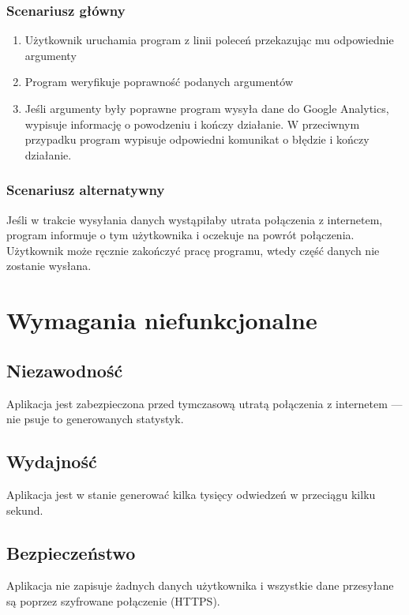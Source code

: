 \documentclass{article}
\begin{document}
\subsubsection{Scenariusz główny}
\begin{enumerate}
\item Użytkownik uruchamia program z linii poleceń przekazując mu odpowiednie argumenty
\item Program weryfikuje poprawność podanych argumentów
\item Jeśli argumenty były poprawne program wysyła dane do Google Analytics, wypisuje informację o powodzeniu i kończy działanie. W przeciwnym przypadku program wypisuje odpowiedni komunikat o błędzie i kończy działanie.
\end{enumerate}

\subsubsection{Scenariusz alternatywny}
Jeśli w trakcie wysyłania danych wystąpiłaby utrata połączenia z internetem, program informuje o tym użytkownika i oczekuje na powrót połączenia. Użytkownik może ręcznie zakończyć pracę programu, wtedy część danych nie zostanie wysłana.

\section{Wymagania niefunkcjonalne}

\subsection{Niezawodność}
Aplikacja jest zabezpieczona przed tymczasową utratą połączenia z internetem --- nie psuje to generowanych statystyk.

\subsection{Wydajność}
Aplikacja jest w stanie generować kilka tysięcy odwiedzeń w przeciągu kilku sekund.

\subsection{Bezpieczeństwo}
Aplikacja nie zapisuje żadnych danych użytkownika i wszystkie dane przesyłane są poprzez szyfrowane połączenie (HTTPS).
\end{document}

